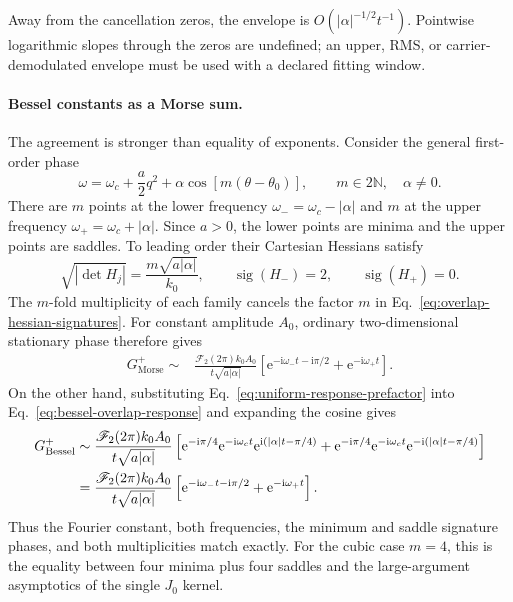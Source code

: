Away from the cancellation zeros, the envelope is
\(O(|\alpha|^{-1/2}t^{-1})\).  Pointwise logarithmic slopes through the
zeros are undefined; an upper, RMS, or carrier-demodulated envelope must be
used with a declared fitting window.

\paragraph{Bessel constants as a Morse sum.}
The agreement is stronger than equality of exponents.  Consider the general
first-order phase
\begin{equation}
  \omega=\omega_c+\frac a2q^2
    +\alpha\cos[m(\theta-\theta_0)],
  \qquad m\in2\mathbb N,\quad \alpha\ne0.
  \label{eq:pure-harmonic-overlap-phase}
\end{equation}
There are \(m\) points at the lower frequency
\(\omega_-=\omega_c-|\alpha|\) and \(m\) at the upper frequency
\(\omega_+=\omega_c+|\alpha|\).  Since \(a>0\), the lower points are
minima and the upper points are saddles.  To leading order their Cartesian
Hessians satisfy
\begin{equation}
  \sqrt{|\det H_j|}
  =\frac{m\sqrt{a|\alpha|}}{k_0},
  \qquad
  \operatorname{sig}(H_-)=2,
  \qquad
  \operatorname{sig}(H_+)=0.
  \label{eq:overlap-hessian-signatures}
\end{equation}
The \(m\)-fold multiplicity of each family cancels the factor \(m\) in
Eq.~\eqref{eq:overlap-hessian-signatures}.  For constant amplitude \(A_0\),
ordinary two-dimensional stationary phase therefore gives
\begin{align}
  G_{\mathrm{Morse}}^{+}
  \sim{}&\frac{\mathscr F_2(2\pi)k_0A_0}
               {t\sqrt{a|\alpha|}}
    \left[
      \mathrm e^{-\mathrm i\omega_-t-\mathrm i\pi/2}
      +\mathrm e^{-\mathrm i\omega_+t}
    \right].
  \label{eq:first-order-morse-overlap-sum}
\end{align}
On the other hand, substituting Eq.~\eqref{eq:uniform-response-prefactor}
into Eq.~\eqref{eq:bessel-overlap-response} and expanding the cosine gives
\begin{align}
  G_{\mathrm{Bessel}}^{+}
  \sim{}&\frac{\mathscr F_2(2\pi)k_0A_0}
               {t\sqrt{a|\alpha|}}
  \left[
    \mathrm e^{-\mathrm i\pi/4}
    \mathrm e^{-\mathrm i\omega_ct}
    \mathrm e^{\mathrm i(|\alpha|t-\pi/4)}
    +
    \mathrm e^{-\mathrm i\pi/4}
    \mathrm e^{-\mathrm i\omega_ct}
    \mathrm e^{-\mathrm i(|\alpha|t-\pi/4)}
  \right]                                                        \notag\\
  ={}&\frac{\mathscr F_2(2\pi)k_0A_0}
               {t\sqrt{a|\alpha|}}
    \left[
      \mathrm e^{-\mathrm i\omega_-t-\mathrm i\pi/2}
      +\mathrm e^{-\mathrm i\omega_+t}
    \right].
  \label{eq:bessel-morse-overlap}
\end{align}
Thus the Fourier constant, both frequencies, the minimum and saddle
signature phases, and both multiplicities match exactly.  For the cubic
case \(m=4\), this is the equality between four minima plus four saddles and
the large-argument asymptotics of the single \(J_0\) kernel.


